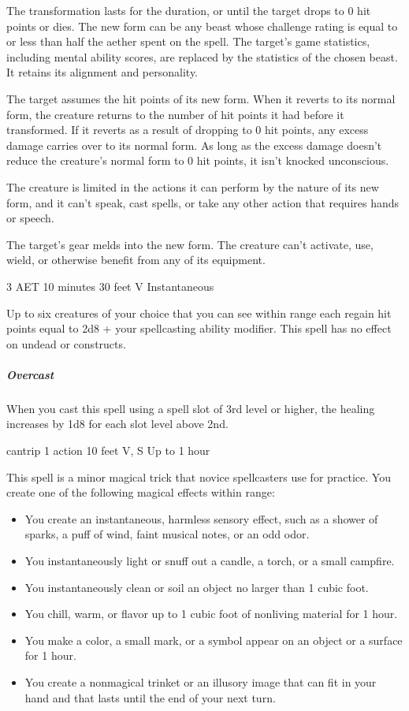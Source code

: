 The transformation lasts for the duration, or until the target drops to 0 hit points or dies. The new form can be any beast whose challenge rating is equal to or less than half the aether spent on the spell. The target's game statistics, including mental ability scores, are replaced by the statistics of the chosen beast. It retains its alignment and personality.

The target assumes the hit points of its new form. When it reverts to its normal form, the creature returns to the number of hit points it had before it transformed. If it reverts as a result of dropping to 0 hit points, any excess damage carries over to its normal form. As long as the excess damage doesn't reduce the creature's normal form to 0 hit points, it isn't knocked unconscious.

The creature is limited in the actions it can perform by the nature of its new form, and it can't speak, cast spells, or take any other action that requires hands or speech.

The target's gear melds into the new form. The creature can't activate, use, wield, or otherwise benefit from any of its equipment.

\label{spell:prayer-of-healing}
{3 AET}
{10 minutes}
{30 feet}
{V}
{Instantaneous}

Up to six creatures of your choice that you can see within range each regain hit points equal to 2d8 + your spellcasting ability modifier. This spell has no effect on undead or constructs.
\subparagraph*{Overcast} When you cast this spell using a spell slot of 3rd level or higher, the healing increases by 1d8 for each slot level above 2nd.

\label{spell:prestidigitation}
{cantrip}
{1 action}
{10 feet}
{V, S}
{Up to 1 hour}

This spell is a minor magical trick that novice spellcasters use for practice. You create one of the following magical effects within range:

\begin{itemize}
\item You create an instantaneous, harmless sensory effect, such as a shower of sparks, a puff of wind, faint musical notes, or an odd odor.
\item You instantaneously light or snuff out a candle, a torch, or a small campfire.
\item You instantaneously clean or soil an object no larger than 1 cubic foot.
\item You chill, warm, or flavor up to 1 cubic foot of nonliving material for 1 hour.
\item You make a color, a small mark, or a symbol appear on an object or a surface for 1 hour.
\item You create a nonmagical trinket or an illusory image that can fit in your hand and that lasts until the end of your next turn.
\end{itemize}

